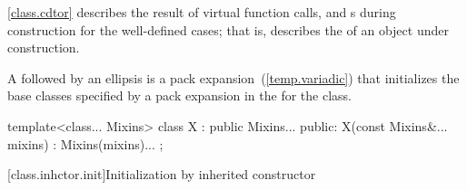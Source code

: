 \pnum
\enternote
\ref{class.cdtor} describes the result of virtual function calls,
and
s
during construction for the well-defined cases;
that is, describes the
of an object under construction.
\exitnote

\pnum
{}%
A  followed by an ellipsis is
a pack expansion~(\ref{temp.variadic}) that initializes the base
classes specified by a pack expansion in the 
for the class. \enterexample

\begin{codeblock}
template<class... Mixins>
class X : public Mixins... {
public:
  X(const Mixins&... mixins) : Mixins(mixins)... { }
};
\end{codeblock}

\exitexample%

[class.inhctor.init]{Initialization by inherited constructor}%

